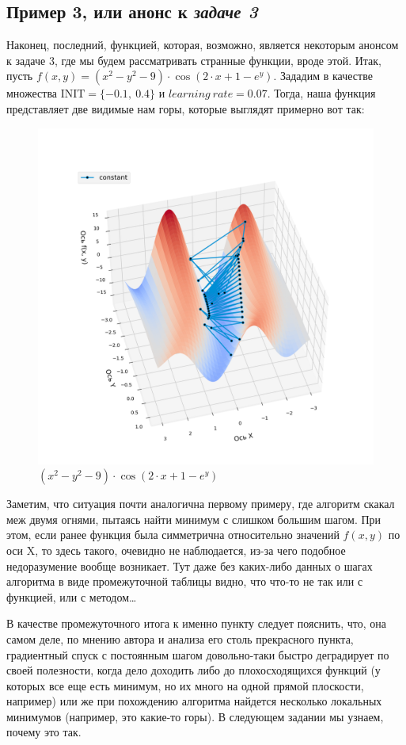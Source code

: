 \documentclass[12pt, a4paper, oneside, final]{article}
\begin{document}
	\subsection*{Пример 3, или анонс к \textit{задаче 3}}
	Наконец, последний, функцией, которая, возможно, является некоторым анонсом к задаче 3, где мы будем рассматривать странные функции, вроде этой. Итак, пусть $f(x, y) = (x^{2} - y^{2} - 9) \cdot \cos(2 \cdot x + 1 - e^{y})$. Зададим в качестве множества $\text{INIT} = \{-0.1, ~ 0.4\}$ и $learning~rate = 0.07$. Тогда, наша функция представляет две видимые нам горы, которые выглядят примерно вот так:
	\begin{figure}[H]
		\centering
		\includegraphics[scale=0.48]{Image/T1_F3.png}
		\caption{$(x^{2} - y^{2} - 9) \cdot \cos(2 \cdot x + 1 - e^{y})$}
	\end{figure}
	Заметим, что ситуация почти аналогична первому примеру, где алгоритм скакал меж двумя огнями, пытаясь найти минимум с слишком большим шагом. При этом, если ранее функция была симметрична относительно значений $f(x, y)$ по оси X, то здесь такого, очевидно не наблюдается, из-за чего подобное недоразумение вообще возникает. Тут даже без каких-либо данных о шагах алгоритма в виде промежуточной таблицы видно, что что-то не так или с функцией, или с методом\ldots

	В качестве промежуточного итога к именно пункту следует пояснить, что, она самом деле, по мнению автора и анализа его столь прекрасного пункта, градиентный спуск с постоянным шагом довольно-таки быстро деградирует по своей полезности, когда дело доходить либо до плохосходящихся функций (у которых все еще есть минимум, но их много на одной прямой плоскости, например) или же при похождению алгоритма найдется несколько локальных минимумов (например, это какие-то горы). В следующем задании мы узнаем, почему это так.
	\newpage
\end{document}
